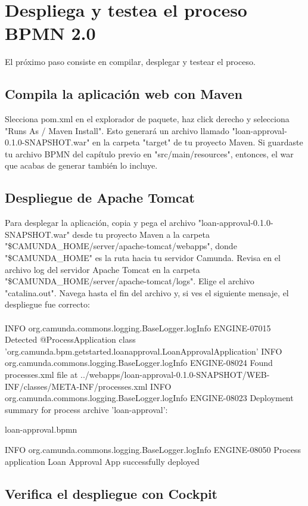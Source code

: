 \documentclass{article}
\begin{document}
\newpage
\section{Despliega y testea el proceso BPMN 2.0}

El próximo paso consiste en compilar, desplegar y testear el proceso.

\subsection{Compila la aplicación web con Maven}

Slecciona pom.xml en el explorador de paquete, haz click derecho y selecciona "Runs As / Maven Install". Esto generará un archivo llamado "loan-approval-0.1.0-SNAPSHOT.war" en la carpeta "target" de tu proyecto Maven.
Si guardaste tu archivo BPMN del capítulo previo en "src/main/resources", entonces, el war que acabas de generar también lo incluye.

\subsection{Despliegue de Apache Tomcat}

Para desplegar la aplicación, copia y pega el archivo "loan-approval-0.1.0-SNAPSHOT.war" desde tu proyecto Maven a la carpeta "\$CAMUNDA\_HOME/server/apache-tomcat/webapps", donde "\$CAMUNDA\_HOME" es la ruta hacia tu servidor Camunda.
Revisa en el archivo log del servidor Apache Tomcat en la carpeta "\$CAMUNDA\_HOME/server/apache-tomcat/logs". Elige el archivo "catalina.out". Navega hasta el fin del archivo y, si ves el siguiente mensaje, el despliegue fue correcto:\\
\\

INFO org.camunda.commons.logging.BaseLogger.logInfo
ENGINE-07015 Detected @ProcessApplication class 'org.camunda.bpm.getstarted.loanapproval.LoanApprovalApplication'
INFO org.camunda.commons.logging.BaseLogger.logInfo
ENGINE-08024 Found processes.xml file at ../webapps/loan-approval-0.1.0-SNAPSHOT/WEB-INF/classes/META-INF/processes.xml
INFO org.camunda.commons.logging.BaseLogger.logInfo
ENGINE-08023 Deployment summary for process archive 'loan-approval':

        loan-approval.bpmn

INFO org.camunda.commons.logging.BaseLogger.logInfo
ENGINE-08050 Process application Loan Approval App successfully deployed

\subsection{Verifica el despliegue con Cockpit}
\end{document}

